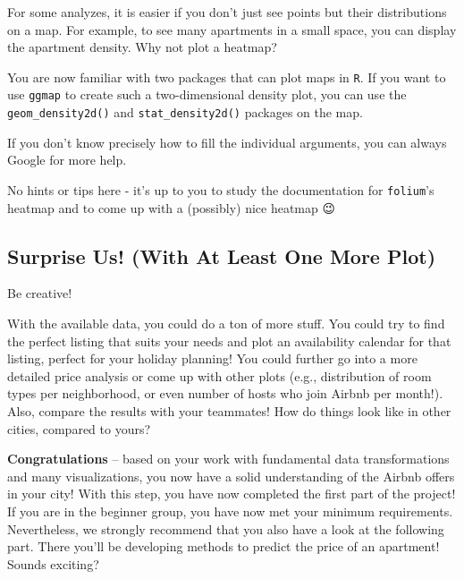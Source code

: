 \documentclass[
  11pt,
]{article}
\newenvironment{tips}[1]
  {
  \begin{itemize}
  \footnotesize
  \renewcommand{\labelitemi}{
    \raisebox{-.7\height}[0pt][0pt]{
      {\setkeys{Gin}{width=3em,keepaspectratio}
        \texttt{[image: images/\#1.png]}}
    }
  }
  \setlength{\fboxsep}{1em}
  \begin{rbox}
  \item
  }
  {
  \end{rbox}
  \end{itemize}
  }
\newenvironment{tipsp}[1]
  {
  \begin{itemize}
  \footnotesize
  \renewcommand{\labelitemi}{
    \raisebox{-.7\height}[0pt][0pt]{
      {\setkeys{Gin}{width=3em,keepaspectratio}
        \texttt{[image: images/\#1.png]}}
    }
  }
  \setlength{\fboxsep}{1em}
  \begin{pbox}
  \item
  }
  {
  \end{pbox}
  \end{itemize}
  }
\begin{document}
For some analyzes, it is easier if you don't just see points but their distributions on a map.
For example, to see many apartments in a small space, you can display the apartment density.
Why not plot a heatmap?

\begin{tips}r
You are now familiar with two packages that can plot maps in \texttt{R}.
If you want to use \texttt{ggmap} to create such a two-dimensional density plot, you can use the \texttt{geom\_density2d()} and \texttt{stat\_density2d()} packages on the map.

If you don't know precisely how to fill the individual arguments, you can always Google for more help.

\end{tips}

\begin{tipsp}p
No hints or tips here - it's up to you to study the documentation for \texttt{folium}'s heatmap and to come up with a (possibly) nice heatmap 😉

\end{tipsp}

\hypertarget{surprise-us-with-at-least-one-more-plot}{%
\subsection{Surprise Us! (With At Least One More Plot)}\label{surprise-us-with-at-least-one-more-plot}}

Be creative!

With the available data, you could do a ton of more stuff.
You could try to find the perfect listing that suits your needs and plot an availability calendar for that listing, perfect for your holiday planning!
You could further go into a more detailed price analysis or come up with other plots (e.g., distribution of room types per neighborhood, or even number of hosts who join Airbnb per month!).
Also, compare the results with your teammates!
How do things look like in other cities, compared to yours?

\textbf{Congratulations} -- based on your work with fundamental data transformations and many visualizations, you now have a solid understanding of the Airbnb offers in your city!
With this step, you have now completed the first part of the project!
If you are in the beginner group, you have now met your minimum requirements.
Nevertheless, we strongly recommend that you also have a look at the following part.
There you'll be developing methods to predict the price of an apartment!
Sounds exciting?
\end{document}
